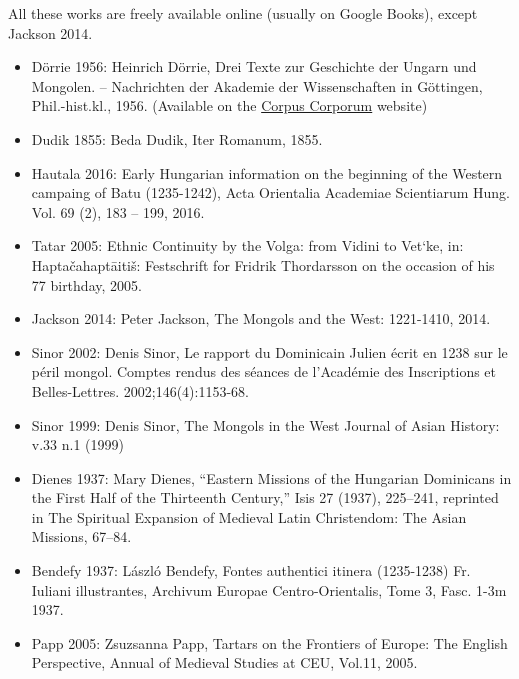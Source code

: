 All these works are freely available online (usually on Google Books), except Jackson 2014. 

\begin{itemize}

\item Dörrie 1956: Heinrich Dörrie, Drei Texte zur Geschichte der Ungarn und Mongolen. – Nachrichten der Akademie der Wissenschaften in Göttingen, Phil.-hist.kl., 1956. (Available on the  \href{https://www.mlat.uzh.ch/browser?path=/34/28/17/6}{Corpus Corporum} website) 

\item Dudik 1855: Beda Dudik, Iter Romanum, 1855.
 

\item Hautala 2016: Early Hungarian information on the beginning of the Western campaing of Batu (1235-1242), Acta Orientalia Academiae Scientiarum Hung. Vol. 69 (2), 183 – 199,  2016.

\item Tatar 2005: Ethnic Continuity by the Volga: from Vidini to Vet`ke, in: Haptačahaptāitiš: Festschrift for Fridrik Thordarsson on the occasion of his 77 birthday, 2005.

\item Jackson 2014: Peter Jackson, The Mongols and the West: 1221-1410, 2014.

\item Sinor 2002: Denis Sinor, Le rapport du Dominicain Julien écrit en 1238 sur le péril mongol. Comptes rendus des séances de l'Académie des Inscriptions et Belles-Lettres. 2002;146(4):1153-68.

\item Sinor 1999: Denis Sinor, The Mongols in the West Journal of Asian History: v.33 n.1 (1999)

\item Dienes 1937: Mary Dienes, “Eastern Missions of the Hungarian Dominicans in the First Half of the Thirteenth Century,” Isis 27 (1937), 225–241, reprinted in The Spiritual Expansion of Medieval Latin Christendom: The Asian Missions, 67–84.

\item Bendefy 1937: László Bendefy, Fontes authentici itinera (1235-1238) Fr. Iuliani illustrantes, Archivum Europae Centro-Orientalis, Tome 3, Fasc. 1-3m 1937.

\item Papp 2005: Zsuzsanna Papp, Tartars on the Frontiers of Europe: The English Perspective, Annual of Medieval Studies at CEU, Vol.11, 2005.

\end{itemize}

